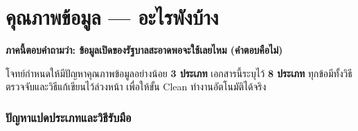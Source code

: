 \documentclass[11pt,a4paper]{article}
\begin{document}
\clearpage

\part{คุณภาพข้อมูล — อะไรพังบ้าง}

\textbf{ภาคนี้ตอบคำถามว่า: ข้อมูลเปิดของรัฐบาลสะอาดพอจะใช้เลยไหม (คำตอบคือไม่)}

โจทย์กำหนดให้มีปัญหาคุณภาพข้อมูลอย่างน้อย \textbf{3 ประเภท} เอกสารนี้ระบุไว้ \textbf{8 ประเภท}
ทุกข้อมีทั้งวิธีตรวจจับและวิธีแก้เขียนไว้ล่วงหน้า เพื่อให้ขั้น Clean ทำงานอัตโนมัติได้จริง

\section{ปัญหาแปดประเภทและวิธีรับมือ}
\end{document}
